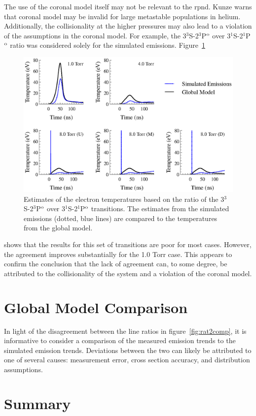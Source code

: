 The use of the coronal model itself may not be relevant to the \acs{rpnd}. Kunze
\cite{Kunze2009} warns that coronal model may be invalid for large metastable
populations in helium. Additionally, the collisionality at the higher pressures
may also lead to a violation of the assumptions in the coronal model. For
example, the 3$^3$S-2$^3$P$^\mathrm{o}$ over 3$^1$S-2$^1$P$^\mathrm{o}$ ratio was considered
solely for the simulated emissions. Figure~\ref{fig:rat1comp}
\begin{figure}
  \centering
  \includegraphics{./chapters/emissions/figures/rat1comp.eps}
  \caption{Estimates of the electron temperatures based on the ratio of the
    3$^3$S-2$^3$P$^\mathrm{o}$ over 3$^1$S-2$^1$P$^\mathrm{o}$ transitions. The estimates from
    the simulated emissions (dotted, blue lines) are compared to the temperatures
    from the global model.}
  \label{fig:rat1comp}
\end{figure}
shows that the results for this set of transitions are poor for most cases.
However, the agreement improves substantially for the 1.0 Torr case. This
appears to confirm the conclusion that the lack of agreement can, to some
degree, be attributed to the collisionality of the system and a violation of the
coronal model.

\section{Global Model Comparison}

In light of the disagreement between the line ratios in
figure~\ref{fig:rat2comp}, it is informative to consider a comparison of the
measured emission trends to the simulated emission trends. Deviations between
the two can likely be attributed to one of several causes: measurement error,
cross section accuracy, and distribution assumptions.

\section{Summary}
